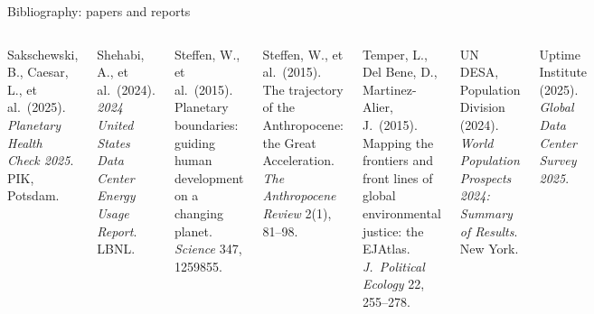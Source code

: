 \begin{frame}{Bibliography: papers and reports}
\begin{columns}[T,onlytextwidth]
    Sakschewski, B., Caesar, L., et al.\ (2025). \emph{Planetary Health Check 2025}. PIK, Potsdam.\par\vspace{1pt}
    Shehabi, A., et al.\ (2024). \emph{2024 United States Data Center Energy Usage Report}. LBNL.\par\vspace{1pt}
    Steffen, W., et al.\ (2015). Planetary boundaries: guiding human development on a changing planet. \emph{Science} 347, 1259855.\par\vspace{1pt}
    Steffen, W., et al.\ (2015). The trajectory of the Anthropocene: the Great Acceleration. \emph{The Anthropocene Review} 2(1), 81–98.\par\vspace{1pt}
    Temper, L., Del Bene, D., Martinez-Alier, J.\ (2015). Mapping the frontiers and front lines of global environmental justice: the EJAtlas. \emph{J.\ Political Ecology} 22, 255–278.\par\vspace{1pt}
    UN DESA, Population Division (2024). \emph{World Population Prospects 2024: Summary of Results}. New York.\par\vspace{1pt}
    Uptime Institute (2025). \emph{Global Data Center Survey 2025}.\par
  \end{columns}
\end{frame}

